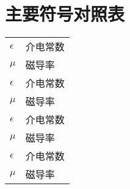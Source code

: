 \chapter{主要符号对照表}
\label{chap:symb}
\begin{tabular}{ll}

 \hspace{2em}$\epsilon$       & \hspace{5em}介电常数 \\
 \hspace{2em}$\mu$ \qquad     & \hspace{5em}磁导率 \\
  \hspace{2em}$\epsilon$       & \hspace{5em}介电常数 \\
 \hspace{2em}$\mu$ \qquad     & \hspace{5em}磁导率 \\
 \hspace{2em}$\epsilon$       & \hspace{5em}介电常数 \\
 \hspace{2em}$\mu$ \qquad     & \hspace{5em}磁导率 \\
 \hspace{2em}$\epsilon$       & \hspace{5em}介电常数 \\
 \hspace{2em}$\mu$ \qquad     & \hspace{5em}磁导率 \\


\end{tabular}
